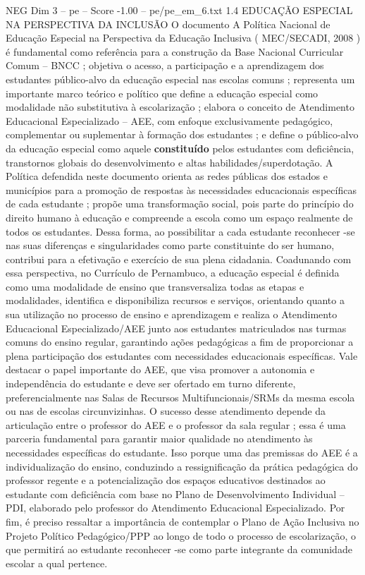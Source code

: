 \begin{textsample}{NEG Dim 3 – pe – Score -1.00 – pe/pe\_em\_6.txt}  \label{ex:f3_neg_004}
1.4 EDUCAÇÃO ESPECIAL NA PERSPECTIVA DA INCLUSÃO O documento A Política Nacional de Educação Especial na Perspectiva da Educação Inclusiva ( MEC/SECADI, 2008 ) é fundamental como referência para a construção da Base Nacional Curricular Comum – BNCC ; objetiva o acesso, a participação e a aprendizagem dos estudantes público-alvo da educação especial nas escolas comuns ; representa um importante marco teórico e político que define a educação especial como modalidade não substitutiva à escolarização ; elabora o conceito de Atendimento Educacional Especializado – AEE, com enfoque exclusivamente pedagógico, complementar ou suplementar à formação dos estudantes ; e define o público-alvo da educação especial como aquele \textbf{constituído} pelos estudantes com deficiência, transtornos globais do desenvolvimento e altas habilidades/superdotação.
A Política defendida neste documento orienta as redes públicas dos estados e municípios para a promoção de respostas às necessidades educacionais específicas de cada estudante ; propõe uma transformação social, pois parte do princípio do direito humano à educação e compreende a escola como um espaço realmente de todos os estudantes.
Dessa forma, ao possibilitar a cada estudante reconhecer -se nas suas diferenças e singularidades como parte constituinte do ser humano, contribui para a efetivação e exercício de sua plena cidadania.
Coadunando com essa perspectiva, no Currículo de Pernambuco, a educação especial é definida como uma modalidade de ensino que transversaliza todas as etapas e modalidades, identifica e disponibiliza recursos e serviços, orientando quanto a sua utilização no processo de ensino e aprendizagem e realiza o Atendimento Educacional Especializado/AEE junto aos estudantes matriculados nas turmas comuns do ensino regular, garantindo ações pedagógicas a fim de proporcionar a plena participação dos estudantes com necessidades educacionais específicas.
Vale destacar o papel importante do AEE, que visa promover a autonomia e independência do estudante e deve ser ofertado em turno diferente, preferencialmente nas Salas de Recursos Multifuncionais/SRMs da mesma escola ou nas de escolas circunvizinhas.
O sucesso desse atendimento depende da articulação entre o professor do AEE e o professor da sala regular ; essa é uma parceria fundamental para garantir maior qualidade no atendimento às necessidades específicas do estudante.
Isso porque uma das premissas do AEE é a individualização do ensino, conduzindo a ressignificação da prática pedagógica do professor regente e a potencialização dos espaços educativos destinados ao estudante com deficiência com base no Plano de Desenvolvimento Individual – PDI, elaborado pelo professor do Atendimento Educacional Especializado.
Por fim, é preciso ressaltar a importância de contemplar o Plano de Ação Inclusiva no Projeto Político Pedagógico/PPP ao longo de todo o processo de escolarização, o que permitirá ao estudante reconhecer -se como parte integrante da comunidade escolar a qual pertence.

\end{textsample}
